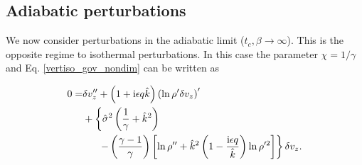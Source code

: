 \subsection{Adiabatic perturbations}\label{analytic_adia}
We now consider %
perturbations in the adiabatic limit ($t_c,\beta\to\infty$). This is the opposite regime to
isothermal perturbations. In this case the parameter $\chi = 1/\gamma$
and Eq. \ref{vertiso_gov_nondim} can be written as 



\begin{align}
  0 =& \delta v_z^{\prime\prime} + \left(1 + \mathrm{i} \epsilon q
    \hat{k}\right)\left(\ln\rho^{\prime}\delta v_z\right)^\prime\notag\\
  &+\left\{\hat{\sigma}^2\left(\frac{1}{\gamma}+\hat{k}^2\right)\right.\notag\\
  &\phantom{0=}\left.-\left(\frac{\gamma-1}{\gamma}\right)\left[\ln\rho^{\prime\prime}+\hat{k}^2\left(1-\frac{\mathrm{i}\epsilon  
          q}{\hat{k}}\right)\ln\rho^{\prime 2}\right]\right\}\delta v_z.\label{adia_iso3}
\end{align}

